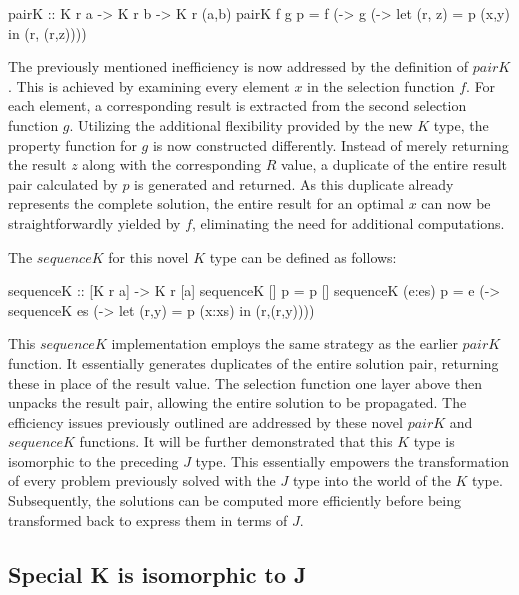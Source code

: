 \documentclass[runningheads]{llncs}
\begin{document}
\begin{code}
pairK :: K r a -> K r b -> K r (a,b)
pairK f g p = f (\x -> 
              g (\y -> let (r, z) = p (x,y) 
                       in (r, (r,z))))
\end{code}

The previously mentioned inefficiency is now addressed by the definition
of \(pairK\). This is achieved by examining every element \(x\) in the
selection function \(f\). For each element, a corresponding result is
extracted from the second selection function \(g\). Utilizing the
additional flexibility provided by the new \(K\) type, the property
function for \(g\) is now constructed differently. Instead of merely
returning the result \(z\) along with the corresponding \(R\) value, a
duplicate of the entire result pair calculated by \(p\) is generated and
returned. As this duplicate already represents the complete solution,
the entire result for an optimal \(x\) can now be straightforwardly
yielded by \(f\), eliminating the need for additional computations.

The \(sequenceK\) for this novel \(K\) type can be defined as follows:

\begin{code}
sequenceK :: [K r a] -> K r [a]
sequenceK [] p     = p []
sequenceK (e:es) p = e (\x -> sequenceK es 
                       (\xs -> let (r,y) = p (x:xs) 
                               in (r,(r,y))))
\end{code}

This \(sequenceK\) implementation employs the same strategy as the
earlier \(pairK\) function. It essentially generates duplicates of the
entire solution pair, returning these in place of the result value. The
selection function one layer above then unpacks the result pair,
allowing the entire solution to be propagated. The efficiency issues
previously outlined are addressed by these novel \(pairK\) and
\(sequenceK\) functions. It will be further demonstrated that this \(K\)
type is isomorphic to the preceding \(J\) type. This essentially
empowers the transformation of every problem previously solved with the
\(J\) type into the world of the \(K\) type. Subsequently, the solutions
can be computed more efficiently before being transformed back to
express them in terms of \(J\).

\subsection{Special K is isomorphic to
J}\label{special-k-is-isomorphic-to-j}
\end{document}
